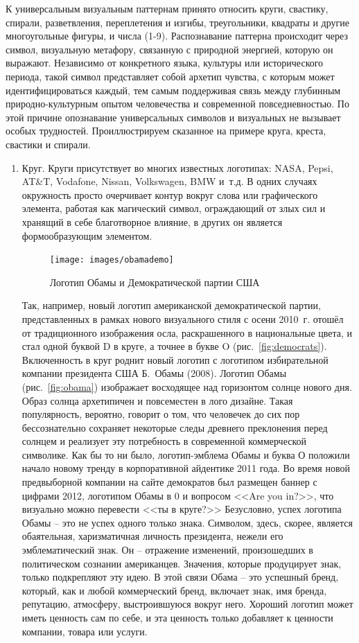 К универсальным визуальным паттернам принято относить  круги, свастику, спирали,
разветвления, переплетения и изгибы, треугольники, квадраты и другие многоугольные
фигуры, и числа (1-9). Распознавание паттерна происходит через символ, визуальную
метафору, связанную с природной энергией, которую он выражают. Независимо от
конкретного языка, культуры или исторического периода, такой символ представляет
собой архетип чувства, с которым может идентифицироваться каждый, тем самым
поддерживая связь между глубинным природно-культурным опытом человечества и
современной повседневностью. По этой причине опознавание универсальных символов
и визуальных не вызывает особых трудностей. Проиллюстрируем сказанное на примере
круга, креста, свастики и спирали.
\begin{enumerate}
\item Круг. Круги присутствует во многих известных логотипах: NASA, Pepsi,
  AT\&T, Vodafone, Nissan, Volkswagen, BMW и~т.д. В одних случаях окружность
  просто очерчивает контур вокруг слова или графического элемента, работая
  как магический символ, ограждающий от злых сил и хранящий в себе благотворное
  влияние, в других он является формообразующим элементом.

\begin{figure}[h!]
  \centering
  \texttt{[image: images/obamademo]}
  \caption{Логотип Обамы и Демократической партии США}
  \label{fig:obamademo}
\end{figure}

   Так, например, новый
  логотип американской демократической партии, представленных в рамках нового
  визуального стиля с осени 2010~г. отошёл от традиционного изображения осла,
  раскрашенного в национальные цвета, и стал одной буквой D в круге, а точнее
  в букве O (рис.~\ref{fig:democrats}). Включенность в круг роднит новый логотип с логотипом
  избирательной компании президента США Б.~Обамы (2008). Логотип Обамы (рис.~\ref{fig:obama})
  изображает восходящее над горизонтом солнце нового дня. Образ солнца архетипичен
  и повсеместен в лого дизайне. Такая популярность, вероятно, говорит о том,
  что человечек до сих пор бессознательно сохраняет некоторые следы древнего
  преклонения перед солнцем и реализует эту потребность в современной
  коммерческой символике. Как бы то ни было, логотип-эмблема Обамы и буква О
  положили начало новому тренду в корпоративной айдентике 2011 года.
  Во время новой предвыборной компании на сайте демократов был размещен
  баннер с цифрами 2012, логотипом Обамы в 0 и вопросом <<Are you in?>>,
  что визуально можно перевести <<ты в круге?>> Безусловно, успех логотипа
  Обамы -- это не успех одного только знака. Символом, здесь, скорее,
  является обаятельная, харизматичная личность президента, нежели его
  эмблематический знак. Он -- отражение изменений, произошедших в политическом
  сознании американцев. Значения, которые продуцирует знак, только подкрепляют
  эту идею. В этой связи Обама -- это успешный бренд, который, как и любой
  коммерческий бренд, включает знак, имя бренда, репутацию, атмосферу,
  выстроившуюся вокруг него. Хороший логотип может иметь ценность сам по себе,
  и эта ценность только добавляет к ценности компании, товара или услуги.


\end{enumerate}
